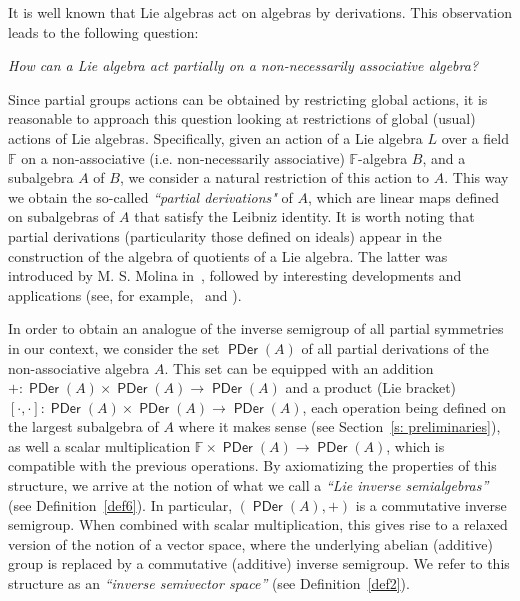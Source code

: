 \documentclass[10pt,a4paper]{amsart}
\theoremstyle{definition}
\theoremstyle{remark}
\numberwithin{equation}{section}
\newtheorem*{Theorem A}{\textbf{Theorem A}}
\newtheorem*{Corollary E}{\textbf{Corollary E}}
\newtheorem*{Corollary F}{\textbf{Corollary F}}
\newtheorem*{Theorem B}{\textbf{Theorem B}}
\newtheorem*{Theorem C}{\textbf{Theorem C}}
\newtheorem*{Theorem D}{\textbf{Theorem B}}
\newtheorem*{p a}{\textbf{Proof of  Theorem A}}
\newtheorem*{p b}{\textbf{Proof of Theorem B}}
\newtheorem*{p c}{\textbf{Proof of  Theorem C}}
\newtheorem*{p d}{\textbf{Proof of  Theorem D}}
\newcommand{\F}{\mathbb{F}}
\newcommand{\0}{{\vartheta}}
\DeclareMathOperator{\pde}{\textsf{PDer}}
\begin{document}
It is well known that Lie algebras act  on  algebras by derivations. This observation leads to the following  question:

\begin{center}
\emph{How can a Lie algebra act partially on a  non-necessarily associative algebra?}\\
\end{center}


 Since partial groups actions can be obtained by restricting global actions, it is reasonable to  approach this question looking  at restrictions of global (usual) actions of Lie algebras. Specifically, given an action of a Lie algebra $L$ over a field $\F$ on a  non-associative (i.e. non-necessarily associative)  $\F$-algebra $B$, and a subalgebra $A$ of $B$, we consider a natural restriction of this action to $A$. This way  we obtain the so-called {\em ``partial derivations"} of $A$, which are linear maps defined on subalgebras of $A$ that satisfy the Leibniz identity. It is worth noting that partial derivations (particularity those defined on ideals) appear in the construction of the algebra of quotients of a Lie algebra. The latter was introduced  by M. S. Molina in~\cite{Molina2004}, followed by   interesting developments and applications (see, for example,~\cite{BresarPereraOrtegaMolina} and \cite{OrtegaMolina}).

In order to obtain an analogue of the inverse semigroup of all partial symmetries in our context, we consider the set $\pde(A)$ of all partial derivations of the non-associative algebra $A$. This set can be equipped with an addition $+:\pde(A)\times \pde(A)\to \pde(A)$ and a product (Lie bracket) $[\cdot,\cdot]:\pde(A)\times \pde(A)\to \pde(A)$, each operation being defined on the largest subalgebra of $A$ where it makes sense (see Section~\ref{s: preliminaries}), as well a  scalar multiplication $\F\times \pde(A)\to \pde(A)$, which is compatible with the previous operations. By axiomatizing the properties of this structure, we arrive at the  notion of what we call a {\em ``Lie inverse semialgebras''} (see Definition~\ref{def6}). In particular, $(\pde(A),+)$ is a commutative inverse semigroup. When combined with scalar multiplication, this gives rise to a relaxed version of the notion of a vector space, where the underlying abelian (additive) group is replaced by a commutative (additive) inverse semigroup. We refer to this structure as an {\em ``inverse semivector space''} (see Definition~\ref{def2}).
\end{document}
